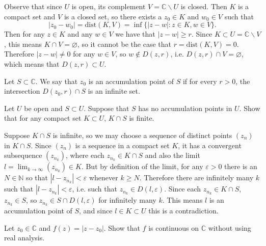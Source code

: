\documentclass{article}
\newcounter{Problem}
\newenvironment{Problem}{\begin{Exercise}[name={Problem},
                                          counter={Problem}]}
                        {\end{Exercise}}
\begin{document}
\begin{Answer}
Observe that since $U$ is open, its complement
$V = \mathbb{C} \backslash U$ is closed. Then
$K$ is a compact set and $V$ is a closed set,
so there exists a $z_0 \in K$ and $w_0 \in V$
such that
$$
  |z_0 - w_0|
= \mathrm{dist}(K, V)
= \inf \{ |z - w| : z \in K, w \in V \}.
$$
Then for any $z \in K$ and any $w \in V$
we have that $|z - w| \geq r$. Since
$K \subset U = \mathbb{C} \backslash V$,
this means $K \cap V = \varnothing$, so it cannot
be the case that $r = \mathrm{dist}(K, V) = 0$.
Therefore $|z - w| \neq 0$ for any $w \in V$,
so $w \notin D(z,r)$, i.e.
$D(z, r) \cap V = \varnothing$, which
means that $D(z, r) \subset U$.
\end{Answer}


\begin{Problem}
  Let $S \subset \mathbb{C}$. We say that $z_0$ is an accumulation
  point of $S$ if for every $r > 0$, the intersection
  $D(z_0, r) \cap S$ is an infinite set.

  Let $U$ be open and $S \subset U$. Suppose that $S$ has no accumulation
  points in $U$. Show that for any compact set $K \subset U$,
  $K \cap S$ is finite.
\end{Problem}

\begin{Answer}
  Suppose $K \cap S$ is infinite, so we may choose a sequence of distinct
  points $(z_n)$ in $K \cap S$. Since $(z_n)$ is a sequence in a compact set
  $K$, it has a convergent subsequence $(z_{n_k})$, where each
  $z_{n_k} \in K \cap S$ and also the limit
  $l = \lim_{k \to \infty} (z_{n_k}) \in K$.
  But by definition of the limit, for any $\varepsilon > 0$
  there is an $N \in \mathbb{N}$ so that
  $|l - z_{n_k}| < \varepsilon$ whenever $k \geq N$.
  Therefore there are infinitely many $k$ such that
  $|l - z_{n_k}| < \varepsilon$, i.e. such that
  $z_{n_k} \in D(l, \varepsilon)$. Since each $z_{n_k} \in K \cap S$,
  $z_{n_k} \in S$, so $z_{n_k} \in S \cap D(l, \varepsilon)$ for
  infinitely many $k$. This means $l$ is an accumulation point of $S$,
  and since $l \in K \subset U$ this is a contradiction.
\end{Answer}

\begin{Problem}
  Let $z_0 \in \mathbb{C}$ and $f(z) = |z - z_0|$. Show that
  $f$ is continuous on $\mathbb{C}$ without using real analysis.
\end{Problem}
\end{document}
